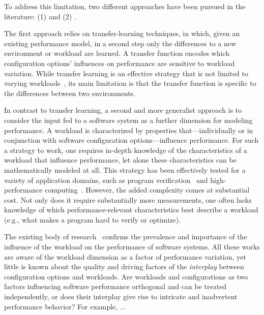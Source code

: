 {\color{red}To address this limitation, two different approaches have been pursued in the literature: (1) and (2) .}

The first approach relies on transfer-learning techniques, in which, given an existing performance model, in a second step only the differences to a new environment or workload are learned. A transfer function encodes which configuration options’ influences on performance are sensitive to workload variation. While transfer learning is an effective strategy that is not limited to varying workloads~\cite{jamshidi_learning_2018,jamishidi_transfer_2017,jamshidi_transfer_gp_2017,martin_transfer_2021,ding_bayesian_2020}, its main limitation is that the transfer function is specific to the differences between two environments.

In contrast to transfer learning, a second and more generalist approach is to consider the input fed to a software system as a further dimension for modeling performance. A workload is characterized by properties that---individually or in conjunction with software configuration options---influence performance. For such a strategy to work, one requires in-depth knowledge of the characteristics of a workload that influence performance, let alone these characteristics can be mathematically modeled at all. This strategy has been effectively tested for a  variety of application domains, such as program verification~\cite{koc_satune_2021} and high-performance computing~\cite{exastencils2014}. However, the added complexity comes at substantial cost. 
Not only does it require substantially more measurements, one often lacks knowledge of which performance-relevant characteristics best describe a workload (e.g., what makes a program hard to verify or optimize).

The existing body of research~\cite{dorn2020,siegmundPerformanceinfluenceModelsHighly2015,haDeepPerf2019,perfAL,guoVariabilityawarePerformancePrediction2013,sarkarCostEfficientSamplingPerformance,guo_2018_data,fourier_learning_2015,perLasso,chen_hinnperf_2022,chen_mmo_2021,nairUsingBadLearners2017,nairFlash18,ohFindingNearoptimalConfigurations2017} confirms the prevalence and importance of the influence of the workload on the performance of software systems. All these works are aware of the workload dimension as a factor of performance variation, yet little is known about the quality and driving factors of the \emph{interplay} between configuration options and workloads. Are workloads and configurations as two factors influencing software performance orthogonal and can be treated independently, or does their interplay give rise to intricate and inadvertent performance behavior? {\color{red}For example, ...}

